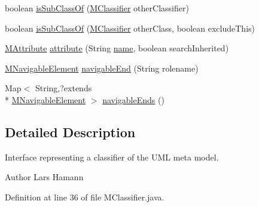 \begin{DoxyCompactItemize}
\item 
boolean \hyperlink{interfaceorg_1_1tzi_1_1use_1_1uml_1_1mm_1_1_m_classifier_adad8cc11fe3aa47634c9ddc435a995f9}{is\-Sub\-Class\-Of} (\hyperlink{interfaceorg_1_1tzi_1_1use_1_1uml_1_1mm_1_1_m_classifier}{M\-Classifier} other\-Classifier)
\item 
boolean \hyperlink{interfaceorg_1_1tzi_1_1use_1_1uml_1_1mm_1_1_m_classifier_a3aa0840c34854dbeb61ce0b7cd1a39f7}{is\-Sub\-Class\-Of} (\hyperlink{interfaceorg_1_1tzi_1_1use_1_1uml_1_1mm_1_1_m_classifier}{M\-Classifier} other\-Class, boolean exclude\-This)
\item 
\hyperlink{classorg_1_1tzi_1_1use_1_1uml_1_1mm_1_1_m_attribute}{M\-Attribute} \hyperlink{interfaceorg_1_1tzi_1_1use_1_1uml_1_1mm_1_1_m_classifier_a830771030449bc6adf51e3312e4b54ab}{attribute} (String \hyperlink{interfaceorg_1_1tzi_1_1use_1_1uml_1_1mm_1_1_m_named_element_af39159f41090d3cacd3dd088f8a6cc42}{name}, boolean search\-Inherited)
\item 
\hyperlink{interfaceorg_1_1tzi_1_1use_1_1uml_1_1mm_1_1_m_navigable_element}{M\-Navigable\-Element} \hyperlink{interfaceorg_1_1tzi_1_1use_1_1uml_1_1mm_1_1_m_classifier_a4c0afafb76e7114d305b57eb83e13402}{navigable\-End} (String rolename)
\item 
Map$<$ String,?extends \\*
\hyperlink{interfaceorg_1_1tzi_1_1use_1_1uml_1_1mm_1_1_m_navigable_element}{M\-Navigable\-Element} $>$ \hyperlink{interfaceorg_1_1tzi_1_1use_1_1uml_1_1mm_1_1_m_classifier_af22950447a74019c68019a338e530ed7}{navigable\-Ends} ()
\end{DoxyCompactItemize}


\subsection{Detailed Description}
Interface representing a classifier of the U\-M\-L meta model.

\begin{DoxyAuthor}{Author}
Lars Hamann 
\end{DoxyAuthor}


Definition at line 36 of file M\-Classifier.\-java.



